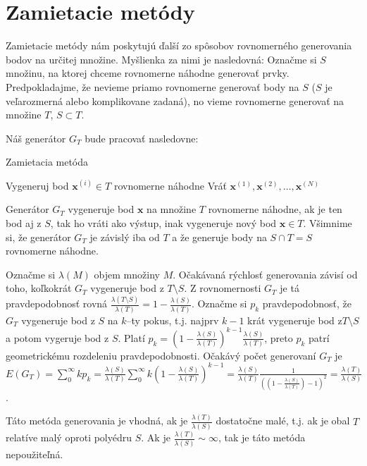 \section{Zamietacie metódy}

Zamietacie metódy nám poskytujú ďalší zo spôsobov rovnomerného generovania bodov na určitej množine.
Myšlienka za nimi je nasledovná: Označme si $S$ množinu, na ktorej chceme rovnomerne náhodne generovať prvky. Predpokladajme, že nevieme priamo rovnomerne generovať body na $S$ ($S$ je veľarozmerná alebo komplikovane zadaná), no vieme rovnomerne generovať na množine $T$, $S \subset T$.

Náš generátor $G_T$ bude pracovať nasledovne:

\begin{algorithm}[H]
	\caption{Zamietacia metóda}
	\label{zamietanie:basic}
	\begin{algorithmic}[1]
			\Repeat
			\State Vygeneruj bod $\mathbf x^{(i)} \in T$ rovnomerne náhodne
		\EndFor
		\State Vráť ${\mathbf x^{(1)},\mathbf x^{(2)},\dots,\mathbf x^{(N)}}$
	\end{algorithmic}
\end{algorithm}
Generátor $G_T$ vygeneruje bod $\mathbf x$ na množine $T$ rovnomerne náhodne, ak je ten bod aj z $S$, tak ho vráti ako výstup, inak vygeneruje nový bod $\mathbf x \in T$. Všimnime si, že generátor $G_T$ je závislý iba od $T$ a že generuje body na $S \cap T=S$ rovnomerne náhodne.

Označme si $\lambda(M)$ objem množiny $M$. Očakávaná rýchlosť generovania závisí od toho, koľkokrát $G_T$ vygeneruje bod z $T \setminus S$. Z rovnomernosti $G_T$ je tá pravdepodobnosť rovná $\frac{\lambda(T \setminus S)}{\lambda(T)} = 1-\frac{\lambda(S)}{\lambda(T)}$. Označme si $p_k$ pravdepodobnosť, že $G_T$ vygeneruje bod z $S$ na $k$--ty pokus, t.j. najprv $k-1$ krát vygeneruje bod z$T \setminus S$ a potom vygeruje bod z $S$. Platí $p_k= (1-\frac{\lambda(S)}{\lambda(T)})^{k-1}\frac{\lambda(S)}{\lambda(T)}$, preto $p_k$ patrí geometrickému rozdeleniu pravdepodobnosti. Očakávý počet generovaní $G_T$ je $E(G_T)=\sum^{\infty}_{0}kp_k=\frac{\lambda(S)}{\lambda(T)} \sum^{\infty}_{0}k(1-\frac{\lambda(S)}{\lambda(T)})^{k-1}=\frac{\lambda(S)}{\lambda(T)} \frac{1}{((1-\frac{\lambda(S)}{\lambda(T)})-1)^2} = \frac{\lambda(T)}{\lambda(S)}$.

Táto metóda generovania je vhodná, ak je $\frac{\lambda(T)}{\lambda(S)}$ dostatočne malé, t.j. ak je obal $T$ relatíve malý oproti polyédru $S$. Ak je $\frac{\lambda(T)}{\lambda(S)} \sim \infty$, tak je táto metóda nepoužiteľná.\\

